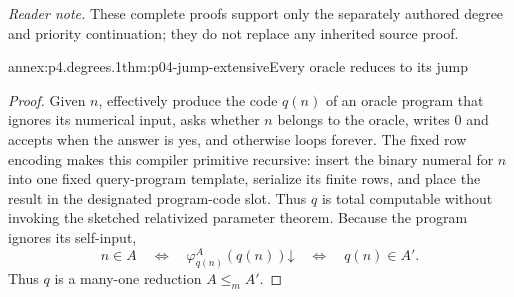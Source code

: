 
\noindent\textit{Reader note.}
These complete proofs support only the separately authored degree and priority
continuation; they do not replace any inherited source proof.

\begin{annexitem}{annex:p4.degrees.1}{thm:p04-jump-extensive}{Every oracle reduces to its jump}
\begin{proof}
Given \(n\), effectively produce the code \(q(n)\) of an oracle program that
ignores its numerical input, asks whether \(n\) belongs to the oracle, writes
\(0\) and accepts when the answer is yes, and otherwise loops forever.  The
fixed row encoding makes this compiler primitive recursive: insert the binary
numeral for \(n\) into one fixed query-program template, serialize its finite
rows, and place the result in the designated program-code slot.  Thus \(q\) is
total computable without invoking the sketched relativized parameter theorem.
Because the program ignores its self-input,
\[
 n\in A
 \quad\Longleftrightarrow\quad
 \varphi^{A}_{q(n)}(q(n))\mathord\downarrow
 \quad\Longleftrightarrow\quad q(n)\in A'.
\]
Thus \(q\) is a many-one reduction \(A\leq_mA'\).
\end{proof}
\end{annexitem}

